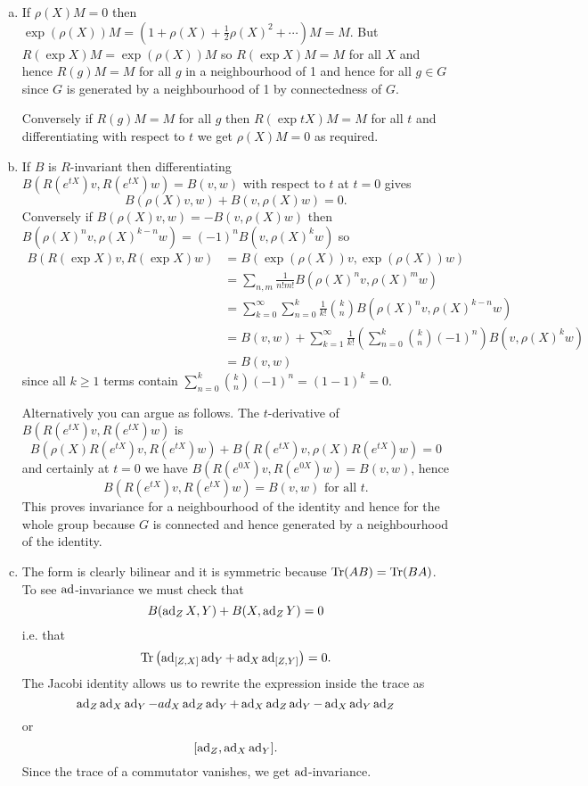 \documentclass[12pt]{article}
\begin{document}
\iffalse
\begin{answer}
\begin{enumerate}[(a)]
\item If $\rho(X)M=0$ then $\exp(\rho(X))M=(1+\rho(X)+\tfrac{1}{2}\rho(X)^2+\cdots)M=M$. But $R(\exp X)M=\exp(\rho(X))M$ so $R(\exp X)M=M$ for all $X$ and hence $R(g)M=M$ for all $g$ in a neighbourhood of 1 and hence for all $g\in G$ since $G$ is generated by a neighbourhood of 1 by connectedness of $G$.

Conversely if $R(g)M=M$ for all $g$ then $R(\exp tX)M=M$ for all $t$ and differentiating with respect to $t$ we get $\rho(X)M=0$ as required.
\item If $B$ is $R$-invariant then differentiating $B(R(e^{tX})v,R(e^{tX})w)=B(v,w)$ with respect to $t$ at $t=0$ gives
\[B(\rho(X)v,w)+B(v,\rho(X)w)=0.\]
Conversely if $B(\rho(X)v,w)=-B(v,\rho(X)w)$ then $B(\rho(X)^nv,\rho(X)^{k-n}w)=(-1)^nB(v,\rho(X)^kw)$ so
\begin{align*}
B(R(\exp X)v,R(\exp X)w)&=B(\exp(\rho(X))v,\exp(\rho(X))w)\\
&=\sum_{n,m}\frac{1}{n!m!}B(\rho(X)^nv,\rho(X)^mw)\\
&=\sum_{k=0}^{\infty}\sum_{n=0}^k\frac{1}{k!}\binom{k}{n}B(\rho(X)^nv,\rho(X)^{k-n}w)\\
&=B(v,w)+\sum_{k=1}^{\infty}\frac{1}{k!}\left(\sum_{n=0}^k\binom{k}{n}(-1)^n\right)B(v,\rho(X)^kw)\\
&=B(v,w)
\end{align*}
since all $k\geq 1$ terms contain $\sum_{n=0}^k\binom{k}{n}(-1)^n=(1-1)^k=0$.

Alternatively you can argue as follows. The $t$-derivative of $B(R(e^{tX})v,R(e^{tX})w)$ is
\[B(\rho(X)R(e^{tX})v,R(e^{tX})w)+B(R(e^{tX})v,\rho(X)R(e^{tX})w)=0\]
and certainly at $t=0$ we have $B(R(e^{0X})v,R(e^{0X})w)=B(v,w)$, hence
\[B(R(e^{tX})v,R(e^{tX})w)=B(v,w)\mbox{ for all }t.\]
This proves invariance for a neighbourhood of the identity and hence for the whole group because $G$ is connected and hence generated by a neighbourhood of the identity.
\item The form is clearly bilinear and it is symmetric because $\operatorname{Tr}(AB)=\operatorname{Tr}(BA)$. To see $\operatorname{ad}$-invariance we must check that
\[B(\operatorname{ad}_ZX,Y)+B(X,\operatorname{ad}_ZY)=0\]
i.e. that
\[\operatorname{Tr}\left(\operatorname{ad}_{[Z,X]}\operatorname{ad}_Y+\operatorname{ad}_X\operatorname{ad}_{[Z,Y]}\right)=0.\]
The Jacobi identity allows us to rewrite the expression inside the trace as
\[\operatorname{ad}_Z\operatorname{ad}_X\operatorname{ad}_Y-ad_X\operatorname{ad}_Z\operatorname{ad}_Y+\operatorname{ad}_X\operatorname{ad}_Z\operatorname{ad}_Y-\operatorname{ad}_X\operatorname{ad}_Y\operatorname{ad}_Z\]
or
\[[\operatorname{ad}_Z,\operatorname{ad}_X\operatorname{ad}_Y].\]
Since the trace of a commutator vanishes, we get $\operatorname{ad}$-invariance.


\end{enumerate}
\end{answer}
\end{document}
